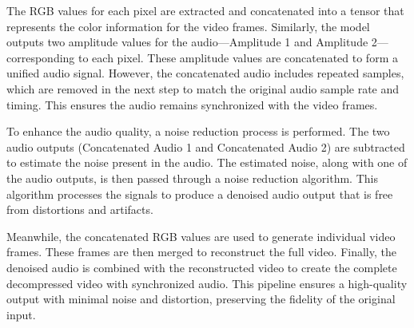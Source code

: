         The RGB values for each pixel are extracted and concatenated into a tensor that represents the color information for the video frames. Similarly, the model outputs two amplitude values for the audio—Amplitude 1 and Amplitude 2—corresponding to each pixel. These amplitude values are concatenated to form a unified audio signal. However, the concatenated audio includes repeated samples, which are removed in the next step to match the original audio sample rate and timing. This ensures the audio remains synchronized with the video frames.
        
        To enhance the audio quality, a noise reduction process is performed. The two audio outputs (Concatenated Audio 1 and Concatenated Audio 2) are subtracted to estimate the noise present in the audio. The estimated noise, along with one of the audio outputs, is then passed through a noise reduction algorithm. This algorithm processes the signals to produce a denoised audio output that is free from distortions and artifacts.
        
        Meanwhile, the concatenated RGB values are used to generate individual video frames. These frames are then merged to reconstruct the full video. Finally, the denoised audio is combined with the reconstructed video to create the complete decompressed video with synchronized audio. This pipeline ensures a high-quality output with minimal noise and distortion, preserving the fidelity of the original input.
